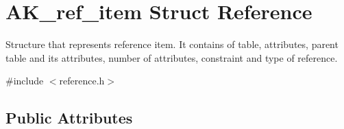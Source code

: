 \hypertarget{structAK__ref__item}{}\section{A\+K\+\_\+ref\+\_\+item Struct Reference}
\label{structAK__ref__item}


Structure that represents reference item. It contains of table, attributes, parent table and it\textquotesingle{}s attributes, number of attributes, constraint and type of reference.  




{\ttfamily \#include $<$reference.\+h$>$}

\subsection*{Public Attributes}
